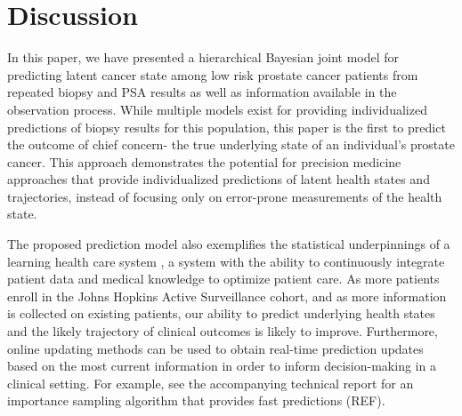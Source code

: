\documentclass[12pt, letterpaper]{article}
\begin{document}
\section{Discussion}
In this paper, we have presented a hierarchical Bayesian joint model for predicting latent cancer state among low risk prostate cancer patients from repeated biopsy and PSA results as well as information available in the observation process. While multiple models exist for providing individualized predictions of biopsy results for this population, this paper is the first to predict the outcome of chief concern- the true underlying state of an individual's prostate cancer. This approach demonstrates the potential for precision medicine approaches that provide individualized predictions of latent health states and trajectories, instead of focusing only on error-prone measurements of the health state. 

The proposed prediction model also exemplifies the statistical underpinnings of a learning health care system \cite{IOM2012,Smith2013}, a system with the ability to continuously integrate patient data and medical knowledge to optimize patient care. As more patients enroll in the Johns Hopkins Active Surveillance cohort, and as more information is collected on existing patients, our ability to predict underlying health states and the likely trajectory of clinical outcomes is likely to improve. Furthermore, online updating methods can be used to obtain real-time prediction updates based on the most current information in order to inform decision-making in a clinical setting. For example, see the accompanying technical report for an importance sampling algorithm that provides fast predictions (REF). %

\end{document}
